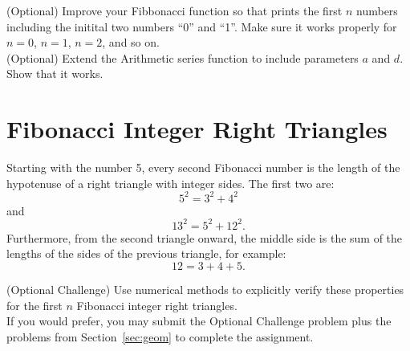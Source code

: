 \plot (Optional) Improve your Fibbonacci function so that prints the
first $n$ numbers including the initital two numbers ``0'' and ``1''.
Make sure it works properly for $n=0$, $n=1$, $n=2$, and so on.\\

\plot (Optional) Extend the Arithmetic series function to include
parameters $a$ and $d$.  Show that it works.\\

\section{Fibonacci Integer Right Triangles}

Starting with the number 5, every second Fibonacci number is the
length of the hypotenuse of a right triangle with integer sides.  The
first two are:
\begin{displaymath}
5^2 = 3^2 + 4^2  
\end{displaymath}
and 
\begin{displaymath}
13^2 = 5^2 + 12^2.  
\end{displaymath}
Furthermore, from the second triangle onward, the middle side is the sum of the lengths of the sides of the previous triangle, for example:
\begin{displaymath}
12 = 3 + 4 + 5.  
\end{displaymath}

\vskip 0.25cm
\plot (Optional Challenge) Use numerical methods to
explicitly verify these properties for the first $n$ Fibonacci integer
right triangles.\\

If you would prefer, you may submit the Optional Challenge problem plus the
problems from Section~\ref{sec:geom} to complete the assignment.

